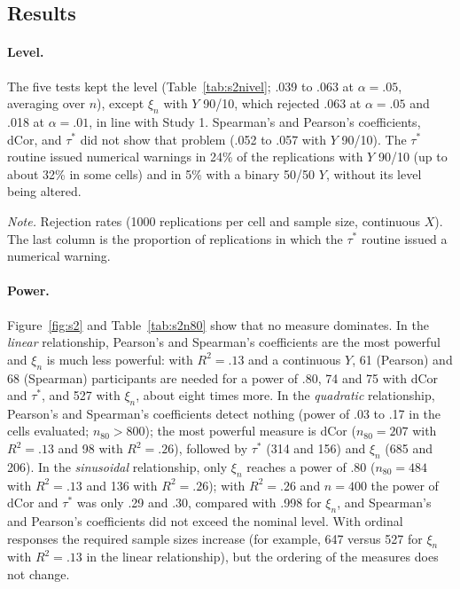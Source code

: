 \documentclass[man,mask,donotrepeattitle,floatsintext]{apa7}
\begin{document}
\subsection{Results}

\paragraph{Level.} The five tests kept the level (Table~\ref{tab:s2nivel}; .039 to .063 at $\alpha=.05$, averaging over $n$), except $\xi_n$ with $Y$ 90/10, which rejected .063 at $\alpha=.05$ and .018 at $\alpha=.01$, in line with Study 1. Spearman's and Pearson's coefficients, dCor, and $\tau^*$ did not show that problem (.052 to .057 with $Y$ 90/10). The $\tau^*$ routine issued numerical warnings in 24\% of the replications with $Y$ 90/10 (up to about 32\% in some cells) and in 5\% with a binary 50/50 $Y$, without its level being altered.

\begin{table}
\caption{Type I Error of the Five Tests Under Independence (Average Over $n=50$--$400$)}
\label{tab:s2nivel}
\begin{threeparttable}
\small

\begin{tablenotes}[flushleft]
\small
\item \textit{Note.} Rejection rates (1000 replications per cell and sample size, continuous $X$). The last column is the proportion of replications in which the $\tau^*$ routine issued a numerical warning.
\end{tablenotes}
\end{threeparttable}
\end{table}

\paragraph{Power.} Figure~\ref{fig:s2} and Table~\ref{tab:s2n80} show that no measure dominates. In the \emph{linear} relationship, Pearson's and Spearman's coefficients are the most powerful and $\xi_n$ is much less powerful: with $R^2=.13$ and a continuous $Y$, 61 (Pearson) and 68 (Spearman) participants are needed for a power of .80, 74 and 75 with dCor and $\tau^*$, and 527 with $\xi_n$, about eight times more. In the \emph{quadratic} relationship, Pearson's and Spearman's coefficients detect nothing (power of .03 to .17 in the cells evaluated; $n_{80}>800$); the most powerful measure is dCor ($n_{80}=207$ with $R^2=.13$ and 98 with $R^2=.26$), followed by $\tau^*$ (314 and 156) and $\xi_n$ (685 and 206). In the \emph{sinusoidal} relationship, only $\xi_n$ reaches a power of .80 ($n_{80}=484$ with $R^2=.13$ and 136 with $R^2=.26$); with $R^2=.26$ and $n=400$ the power of dCor and $\tau^*$ was only .29 and .30, compared with .998 for $\xi_n$, and Spearman's and Pearson's coefficients did not exceed the nominal level. With ordinal responses the required sample sizes increase (for example, 647 versus 527 for $\xi_n$ with $R^2=.13$ in the linear relationship), but the ordering of the measures does not change.
\end{document}
